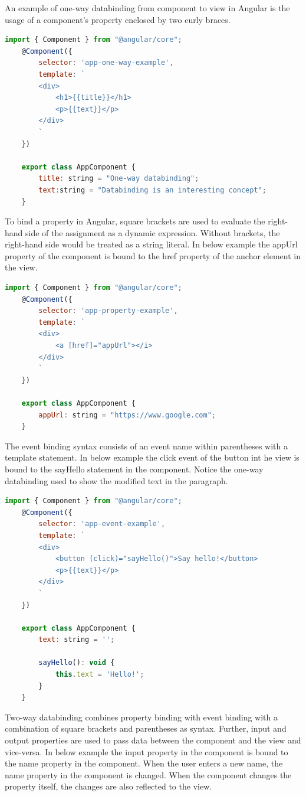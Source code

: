 An example of one-way databinding from component to view in Angular is the usage of a component's property enclosed by two curly braces.
\begin{lstlisting}[language=Javascript]
	import { Component } from "@angular/core";
	@Component({
		selector: 'app-one-way-example',
		template: `
		<div>
			<h1>{{title}}</h1>
			<p>{{text}}</p>
		</div>
		`
	})
	
	export class AppComponent {
		title: string = "One-way databinding";
		text:string = "Databinding is an interesting concept";
	}
\end{lstlisting}

To bind a property in Angular, square brackets are used to evaluate the right-hand side of the assignment as a dynamic expression. Without brackets, the right-hand side would be treated as a string literal. In below example the appUrl property of the component is bound to the href property of the anchor element in the view.
\begin{lstlisting}[language=Javascript]
	import { Component } from "@angular/core";
	@Component({
		selector: 'app-property-example',
		template: `
		<div>
			<a [href]="appUrl"></i>
		</div>
		`
	})
	
	export class AppComponent {
		appUrl: string = "https://www.google.com";
	}
\end{lstlisting}

The event binding syntax consists of an event name within parentheses with a template statement. In below example the click event of the button int he view is bound to the sayHello statement in the component. Notice the one-way databinding used to show the modified text in the paragraph.
\begin{lstlisting}[language=Javascript]
	import { Component } from "@angular/core";
	@Component({
		selector: 'app-event-example',
		template: `
		<div>
			<button (click)="sayHello()">Say hello!</button>
			<p>{{text}}</p>
		</div>
		`
	})
	
	export class AppComponent {
		text: string = '';
		
		sayHello(): void {
			this.text = 'Hello!';
		}
	}
\end{lstlisting}


Two-way databinding combines property binding with event binding with a combination of square brackets and parentheses as syntax. Further, input and output properties are used to pass data between the component and the view and vice-versa. In below example the input property in the component is bound to the name property in the component. When the user enters a new name, the name property in the component is changed. When the component changes the property itself, the changes are also reflected to the view.

